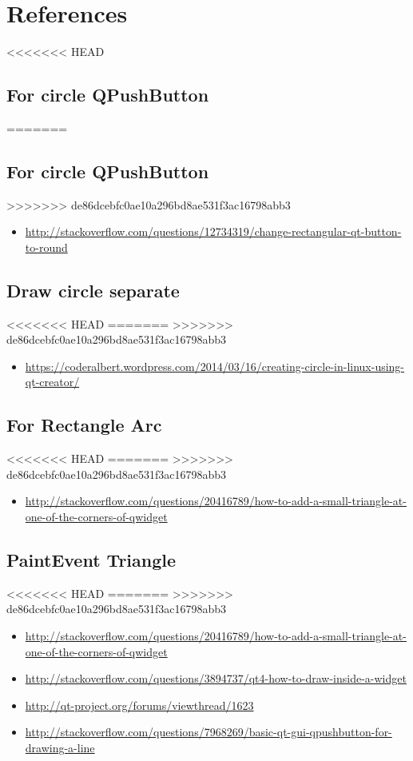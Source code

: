 \documentclass[9pt,b5paper]{article}
\begin{document}
\section{References}
<<<<<<< HEAD
\label{sec-18}
\subsection{For circle QPushButton}
\label{sec-18-1}
=======
\label{sec-17}
\subsection{For circle QPushButton}
\label{sec-17-1}
>>>>>>> de86dcebfc0ae10a296bd8ae531f3ac16798abb3
\begin{itemize}
\item \url{http://stackoverflow.com/questions/12734319/change-rectangular-qt-button-to-round}
\end{itemize}
\subsection{Draw circle separate}
<<<<<<< HEAD
\label{sec-18-2}
=======
\label{sec-17-2}
>>>>>>> de86dcebfc0ae10a296bd8ae531f3ac16798abb3
\begin{itemize}
\item \url{https://coderalbert.wordpress.com/2014/03/16/creating-circle-in-linux-using-qt-creator/}
\end{itemize}
\subsection{For Rectangle Arc}
<<<<<<< HEAD
\label{sec-18-3}
=======
\label{sec-17-3}
>>>>>>> de86dcebfc0ae10a296bd8ae531f3ac16798abb3
\begin{itemize}
\item \url{http://stackoverflow.com/questions/20416789/how-to-add-a-small-triangle-at-one-of-the-corners-of-qwidget}
\end{itemize}
\subsection{PaintEvent Triangle}
<<<<<<< HEAD
\label{sec-18-4}
=======
\label{sec-17-4}
>>>>>>> de86dcebfc0ae10a296bd8ae531f3ac16798abb3
\begin{itemize}
\item \url{http://stackoverflow.com/questions/20416789/how-to-add-a-small-triangle-at-one-of-the-corners-of-qwidget}
\item \url{http://stackoverflow.com/questions/3894737/qt4-how-to-draw-inside-a-widget}
\item \url{http://qt-project.org/forums/viewthread/1623}
\item \url{http://stackoverflow.com/questions/7968269/basic-qt-gui-qpushbutton-for-drawing-a-line}
\end{itemize}
\end{document}

